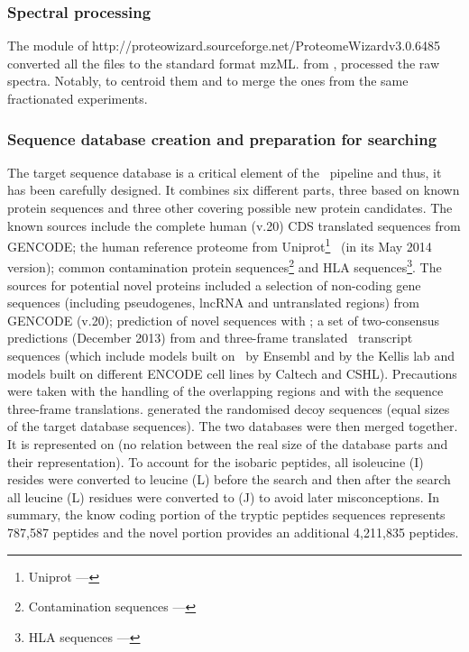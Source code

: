 \subsubsection{Spectral processing}

The  module of %
{http://proteowizard.sourceforge.net/}{ProteomeWizard}{v3.0.6485}
converted all the files to the standard format mzML.\@
{} from
,
processed the raw spectra. Notably,  to centroid them
and  to merge the ones from the same fractionated experiments.

\subsubsection{Sequence database creation and preparation for searching}

The target sequence database is a critical element of the \ms\ pipeline and thus,
it has been carefully designed. It combines six different parts, three based on
known protein sequences and three other covering possible new protein candidates.
The known sources include the complete human  (v.20) \gls{CDS} translated
sequences from \gls{GENCODE}; the human reference proteome from
\gls{Uniprot}\footnote{%
\gls{Uniprot} --- }~
(in its May 2014 version); common contamination protein
sequences\footnote{Contamination sequences ---
}
and \gls{HLA} sequences\footnote{\gls{HLA} sequences ---
}.
The sources for potential
novel proteins included a selection of non-coding gene sequences (including
pseudogenes, \gls{lncRNA} and untranslated regions) from \gls{GENCODE}
 (v.20); prediction of novel sequences with
;
a set of two-consensus predictions (December 2013)
from 
and three-frame translated \Rnaseq\ transcript sequences (which include models
built on \ibm\ by \gls{Ensembl} and by the Kellis lab and models built on
different \gls{ENCODE} cell lines by Caltech and CSHL). Precautions were taken
with the handling of the overlapping regions and with the sequence three-frame
translations.
 generated the randomised
decoy sequences (equal sizes of the target database sequences).
The two databases were then merged together.
It is represented on 
(no relation between the real size of the database parts and their representation).
To account for the isobaric peptides, all isoleucine (I) resides were
converted to leucine (L) before the search and then after the search all leucine
(L) residues were converted to (J) to avoid later misconceptions.
In summary, the know coding portion of the tryptic peptides sequences represents
787,587 peptides and the novel portion provides an additional 4,211,835 peptides.

